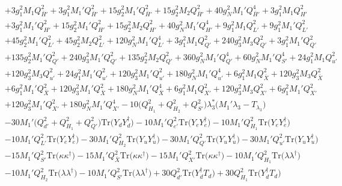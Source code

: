 {\begin{align}
 &+3 g_{1}^{2} M_1 Q_{\bar{H}'}^{2} +3 g_{1}^{2} M_1' Q_{\bar{H}'}^{2} +15 g_{2}^{2} M_1' Q_{\bar{H}'}^{2} +15 g_{2}^{2} M_2 Q_{\bar{H}'}^{2} +40 g_{N}^{2} M_1' Q_{\bar{H}'}^{4} +3 g_{1}^{2} M_1 Q_{H'}^{2} \nonumber \\ 
 &+3 g_{1}^{2} M_1' Q_{H'}^{2} +15 g_{2}^{2} M_1' Q_{H'}^{2} +15 g_{2}^{2} M_2 Q_{H'}^{2} +40 g_{N}^{2} M_1' Q_{H'}^{4} +9 g_{1}^{2} M_1 Q_{L'}^{2} +9 g_{1}^{2} M_1' Q_{L'}^{2} \nonumber \\ 
 &+45 g_{2}^{2} M_1' Q_{L'}^{2} +45 g_{2}^{2} M_2 Q_{L'}^{2} +120 g_{N}^{2} M_1' Q_{L'}^{4} +3 g_{1}^{2} M_1 Q_{Q'}^{2} +240 g_{3}^{2} M_3 Q_{Q'}^{2} +3 g_{1}^{2} M_1' Q_{Q'}^{2} \nonumber \\ 
 &+135 g_{2}^{2} M_1' Q_{Q'}^{2} +240 g_{3}^{2} M_1' Q_{Q'}^{2} +135 g_{2}^{2} M_2 Q_{Q'}^{2} +360 g_{N}^{2} M_1' Q_{Q'}^{4} +60 g_{N}^{2} M_1' Q_{S'}^{4} +24 g_{1}^{2} M_1 Q_{u'}^{2} \nonumber \\ 
 &+120 g_{3}^{2} M_3 Q_{u'}^{2} +24 g_{1}^{2} M_1' Q_{u'}^{2} +120 g_{3}^{2} M_1' Q_{u'}^{2} +180 g_{N}^{2} M_1' Q_{u'}^{4} +6 g_{1}^{2} M_1 Q_{\bar{X}}^{2} +120 g_{3}^{2} M_3 Q_{\bar{X}}^{2} \nonumber \\ 
 &+6 g_{1}^{2} M_1' Q_{\bar{X}}^{2} +120 g_{3}^{2} M_1' Q_{\bar{X}}^{2} +180 g_{N}^{2} M_1' Q_{\bar{X}}^{4} +6 g_{1}^{2} M_1 Q_{X'}^{2} +120 g_{3}^{2} M_3 Q_{X'}^{2} +6 g_{1}^{2} M_1' Q_{X'}^{2} \nonumber \\ 
 &+120 g_{3}^{2} M_1' Q_{X'}^{2} +180 g_{N}^{2} M_1' Q_{X'}^{4} -10 \Big(Q_{H_1}^{2} + Q_{H_2}^{2} + Q_{S'}^{2}\Big)\lambda_3^* \Big(M_1' \lambda_3  - T_{\lambda_3} \Big)\nonumber \\ 
 &-30 M_1' \Big(Q_{d'}^{2} + Q_{H_1}^{2} + Q_{Q'}^{2}\Big)\mbox{Tr}\Big({Y_d  Y_{d}^{\dagger}}\Big) -10 M_1' Q_{e'}^{2} \mbox{Tr}\Big({Y_e  Y_{e}^{\dagger}}\Big) -10 M_1' Q_{H_1}^{2} \mbox{Tr}\Big({Y_e  Y_{e}^{\dagger}}\Big) \nonumber \\ 
 &-10 M_1' Q_{L'}^{2} \mbox{Tr}\Big({Y_e  Y_{e}^{\dagger}}\Big) -30 M_1' Q_{H_2}^{2} \mbox{Tr}\Big({Y_u  Y_{u}^{\dagger}}\Big) -30 M_1' Q_{Q'}^{2} \mbox{Tr}\Big({Y_u  Y_{u}^{\dagger}}\Big) -30 M_1' Q_{u'}^{2} \mbox{Tr}\Big({Y_u  Y_{u}^{\dagger}}\Big) \nonumber \\ 
 &-15 M_1' Q_{S'}^{2} \mbox{Tr}\Big({\kappa  \kappa^{\dagger}}\Big) -15 M_1' Q_{\bar{X}}^{2} \mbox{Tr}\Big({\kappa  \kappa^{\dagger}}\Big) -15 M_1' Q_{X'}^{2} \mbox{Tr}\Big({\kappa  \kappa^{\dagger}}\Big) -10 M_1' Q_{H_1}^{2} \mbox{Tr}\Big({\lambda  \lambda^{\dagger}}\Big) \nonumber \\ 
 &-10 M_1' Q_{H_2}^{2} \mbox{Tr}\Big({\lambda  \lambda^{\dagger}}\Big) -10 M_1' Q_{S'}^{2} \mbox{Tr}\Big({\lambda  \lambda^{\dagger}}\Big) +30 Q_{d'}^{2} \mbox{Tr}\Big({Y_{d}^{\dagger}  T_d}\Big) +30 Q_{H_1}^{2} \mbox{Tr}\Big({Y_{d}^{\dagger}  T_d}\Big) \nonumber \\ 

\end{align}}
